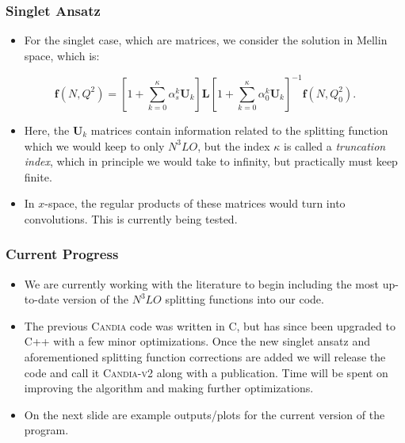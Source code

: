\documentclass{beamer}
\newcommand{\vv}[1]{\mathbf{\bm{#1}}}
\begin{document}
\begin{frame}
  \frametitle{Singlet Ansatz}

  \begin{itemize}
  \item For the singlet case, which are matrices, we consider the solution in Mellin space, which is:
  \end{itemize}

  \begin{equation}
    \vv{f}(N, Q^2) = \left[ 1 + \sum_{k=0}^{\kappa} \alpha_s^k \vv{U}_k \right] \vv{L} \left[ 1 + \sum_{k=0}^{\kappa} \alpha_0^k \vv{U}_k \right]^{-1} \vv{f}(N, Q_0^2).
  \end{equation}

  \begin{itemize}
  \item Here, the $\vv{U}_k$ matrices contain information related to the splitting function which we would keep to only $N^3LO$, but the index $\kappa$ is called a \textit{truncation index}, which in principle we would take to infinity, but practically must keep finite.
  \item In $x$-space, the regular products of these matrices would turn into convolutions. This is currently being tested.
  \end{itemize}
\end{frame}


\begin{frame}
  \frametitle{Current Progress}

  \begin{itemize}
  \item We are currently working with the literature to begin including the most up-to-date version of the $N^3LO$ splitting functions into our code.
  \item The previous \textsc{Candia} code was written in C, but has since been upgraded to C++ with a few minor optimizations. Once the new singlet ansatz and aforementioned splitting function corrections are added we will release the code and call it \textsc{Candia-v2} along with a publication. Time will be spent on improving the algorithm and making further optimizations.
  \item On the next slide are example outputs/plots for the current version of the program.
  \end{itemize}
\end{frame}
\end{document}
